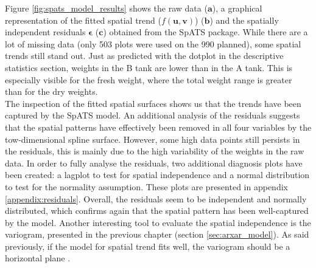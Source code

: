 Figure \ref{fig:spats_model_results} shows the raw data ($\mathbf{a}$), a graphical representation of the fitted spatial trend ($f(\boldsymbol{u}, \boldsymbol{v})$) ($\mathbf{b}$) and the spatially independent residuals $\boldsymbol{\epsilon}$ ($\mathbf{c}$) obtained from the SpATS package. While there are a lot of missing data (only 503 plots were used on the 990 planned), some spatial trends still stand out. Just as predicted with the dotplot in the descriptive statistics section, weights in the B tank are lower than in the A tank. This is especially visible for the fresh weight, where the total weight range is greater than for the dry weights.\\

The inspection of the fitted spatial surfaces shows us that the trends have been captured by the SpATS model. An additional analysis of the residuals suggests that the spatial patterns have effectively been removed in all four variables by the tow-dimensional spline surface. However, some high data points still persists in the residuals, this is mainly due to the high variability of the weights in the raw data. In order to fully analyse the residuals, two additional diagnosis plots have been created: a lagplot to test for spatial independence and a normal distribution to test for the normality assumption. These plots are presented in appendix \ref{appendix:residuals}. Overall, the residuals seem to be independent and normally distributed, which confirms again that the spatial pattern has been well-captured by the model. Another interesting tool to evaluate the spatial independence is the variogram, presented in the previous chapter (section \ref{sec:arxar_model}). 
As said previously, if the model for spatial trend fits well, the variogram should be a horizontal plane \parencite{piepho_linear_2010}.\\

